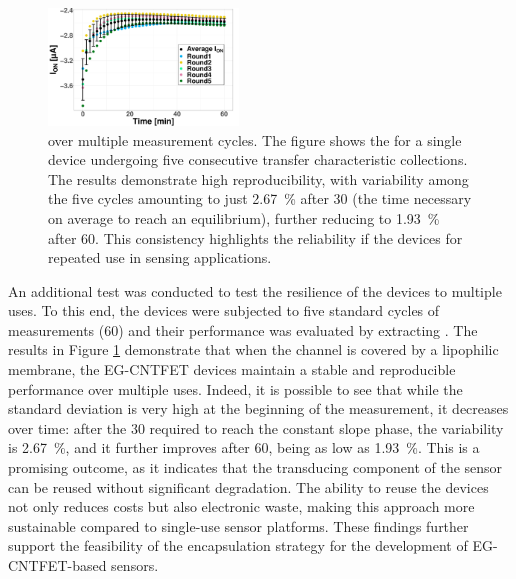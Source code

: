 \begin{figure}
    \centering
    \includegraphics[width=0.45\textwidth]{figures/chapter3/EGFET/repMeas.pdf}
    \caption{\ion{} over multiple measurement cycles. The figure shows the \ion{} for a single device undergoing five consecutive transfer characteristic collections. The results demonstrate high reproducibility, with variability among the five cycles amounting to just \SI{2.67}{\%} after \SI{30}{\min} (the time necessary on average to reach an equilibrium), further reducing to \SI{1.93}{\%} after \SI{60}{\min}. This consistency highlights the reliability if the devices for repeated use in sensing applications.}
    \label{fig:repMeas}
\end{figure}

An additional test was conducted to test the resilience of the devices to multiple uses. To this end, the devices were subjected to five standard cycles of measurements (\SI{60}{\min}) and their performance was evaluated by extracting \ion{}. The results in Figure \ref{fig:repMeas} demonstrate that when the channel is covered by a lipophilic membrane, the EG-CNTFET devices maintain a stable and reproducible performance over multiple uses. Indeed, it is possible to see that while the standard deviation is very high at the beginning of the measurement, it decreases over time: after the \SI{30}{\min} required to reach the constant slope phase, the variability is \SI{2.67}{\%}, and it further improves after \SI{60}{\min}, being as low as \SI{1.93}{\percent}. This is a promising outcome, as it indicates that the transducing component of the sensor can be reused without significant degradation. The ability to reuse the devices not only reduces costs but also electronic waste, making this approach more sustainable compared to single-use sensor platforms. These findings further support the feasibility of the encapsulation strategy for the development of EG-CNTFET-based sensors.

